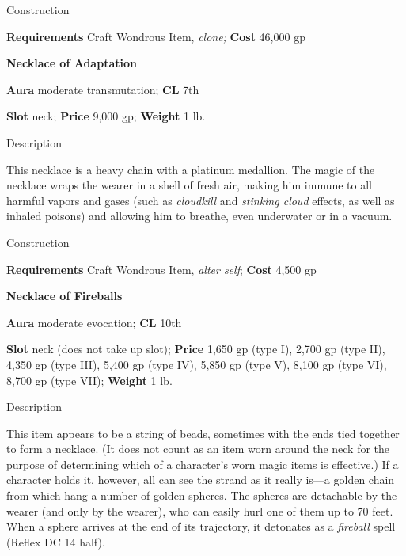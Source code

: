 Construction
				
\textbf{Requirements} Craft Wondrous Item,\textit{ clone;}\textbf{ Cost }46,000 gp
				
\textbf{Necklace of Adaptation}
				
\textbf{Aura} moderate transmutation; \textbf{CL} 7th
				
\textbf{Slot }neck; \textbf{Price} 9,000 gp; \textbf{Weight} 1 lb.
				
Description
				
This necklace is a heavy chain with a platinum medallion. The magic of the necklace wraps the wearer in a shell of fresh air, making him immune to all harmful vapors and gases (such as \textit{cloudkill }and \textit{stinking cloud }effects, as well as inhaled poisons) and allowing him to breathe, even underwater or in a vacuum.
				
Construction
				
\textbf{Requirements }Craft Wondrous Item, \textit{alter self}; \textbf{Cost} 4,500 gp
				
\textbf{Necklace of Fireballs}
				
\textbf{Aura} moderate evocation;\textbf{ CL }10th
				
\textbf{Slot} neck (does not take up slot); \textbf{Price} 1,650 gp (type I), 2,700 gp (type II), 4,350 gp (type III), 5,400 gp (type IV), 5,850 gp (type V), 8,100 gp (type VI), 8,700 gp (type VII); \textbf{Weight }1 lb.
				
Description
				
This item appears to be a string of beads, sometimes with the ends tied together to form a necklace. (It does not count as an item worn around the neck for the purpose of determining which of a character's worn magic items is effective.) If a character holds it, however, all can see the strand as it really is---a golden chain from which hang a number of golden spheres. The spheres are detachable by the wearer (and only by the wearer), who can easily hurl one of them up to 70 feet. When a sphere arrives at the end of its trajectory, it detonates as a\textit{ fireball} spell (Reflex DC 14 half).
				
